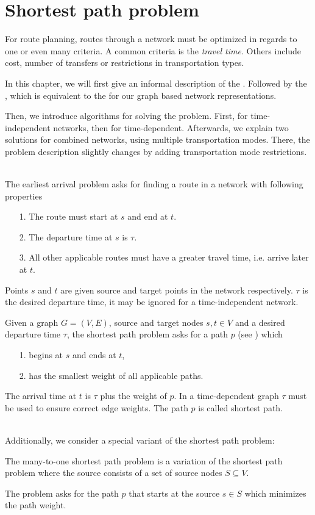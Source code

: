 \section{Shortest path problem}\label{shortestPathProblem}
	For route planning, routes through a network must be optimized in regards to one or even many criteria.
	A common criteria is the \textit{travel time}. Others include cost, number of transfers or restrictions
	in transportation types.
	
	In this chapter, we will first give an informal description of the \earliestArrivalProblem. Followed by
	the \shortestPathProblem, which is equivalent to the \earliestArrivalProblem for our graph based network
	representations.
	
	Then, we introduce algorithms for solving the problem. First, for time-independent networks, then for time-dependent.
	Afterwards, we explain two solutions for combined networks, using multiple transportation modes. There, the problem
	description slightly changes by adding transportation mode restrictions.\\\\
	\begin{mydef}
		The earliest arrival problem asks for finding a \textnormal{route} in a network with following properties
		\begin{itemize}
			\item[1.] The route must start at $s$ and end at $t$.
			\item[2.] The departure time at $s$ is $\tau$.
			\item[3.] All other applicable routes must have a greater travel time, i.e. arrive later at $t$.
		\end{itemize}
		Points $s$ and $t$ are given source and target points in the network respectively. $\tau$ is the desired departure time,
		it may be ignored for a time-independent network.
	\end{mydef}
	\begin{mydef}
		Given a graph $G = (V, E)$, source and target nodes $s, t \in V$ and a desired departure time $\tau$, the shortest path
		problem asks for a path $p$ (see ) which
		\begin{itemize}
			\item[1.] begins at $s$ and ends at $t$,
			\item[2.] has the smallest weight of all applicable paths.
		\end{itemize}
		The arrival time at $t$ is $\tau$ plus the weight of $p$. In a time-dependent
		graph $\tau$ must be used to ensure correct edge weights. The path $p$ is called \textnormal{shortest path}.
	\end{mydef}\quad\\
	Additionally, we consider a special variant of the shortest path problem:
	\begin{mydef}
		The many-to-one shortest path problem is a variation of the shortest path problem
		where the source consists of a set of source nodes $S \subseteq V$.

		The problem asks for the path $p$ that starts at the source $s \in S$ which minimizes the path weight.
	\end{mydef}

